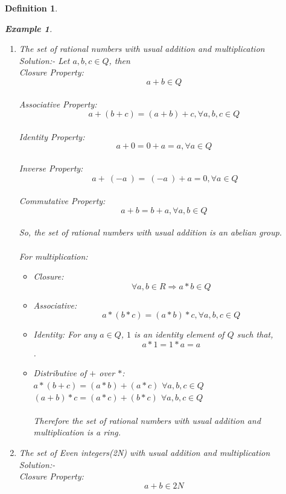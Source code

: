 \documentclass{article}
\newtheorem{defn}{Definition} [section]
\newtheorem{ex}{Example}[section]
\begin{document}
\begin{defn}
\begin{ex}
\begin{enumerate}
\begin{itemize}
	    \item Identity: For any $a \in R$, $1$ is an identity element of $R$ such that, $$a*1=1*a=a$$ .
		\item Distributive of $+$ over $*$:\\
	        $a*(b+c)=(a*b)+ (a*c)$  $ \forall a,b,c \in R $ \\
	        $(a+b)*c=(a*c)+(b*c)$   $ \forall a,b,c \in R $ \\
	\\Therefore the set of real numbers with usual addition and multiplication is a ring.
	\end{itemize}
	\item The set of rational numbers with usual addition and multiplication
	\\ Solution:- Let $a,b,c \in Q$, then 
	\\Closure Property: $$a+b \in Q$$
	\\Associative Property: $$a+(b+c)=(a+b)+c, \forall a,b,c \in Q$$
	\\Identity Property: $$a+0=0+a=a, \forall a \in Q$$
	\\Inverse Property: $$ \ a + \ (-a\ ) =\ (-a\ ) + a = 0, \forall a \in Q$$
	\\Commutative Property: $$a+b=b+a,\forall a,b \in Q$$
	\\So, the set of rational numbers with usual addition is an abelian group.\\
	\\For multiplication:
	\begin{itemize}
	    \item Closure: $$\forall a, b \in R \Rightarrow a*b \in Q$$
        \item Associative: $$a*(b*c)=(a*b)*c, \forall a,b,c \in Q$$
	    \item Identity: For any $a \in Q$, $1$ is an identity element of $Q$ such that, $$a*1=1*a=a$$ .
		\item Distributive of $+$ over $*$:\\
	        $a*(b+c)=(a*b)+ (a*c)$  $ \forall a,b,c \in Q $ \\
	        $(a+b)*c=(a*c)+(b*c)$   $ \forall a,b,c \in Q $ \\
	    \\Therefore the set of rational numbers with usual addition and multiplication is a ring.
	\end{itemize}
	\item The set of Even integers(2N) with usual addition and multiplication
	\\ Solution:- 	\\Closure Property: $$a+b \in 2N$$

\end{enumerate}
\end{ex}
\end{defn}
\end{document}

